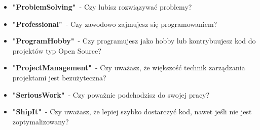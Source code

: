\begin{appendices}
\begin{itemize}
        \item \textbf{"ProblemSolving"}~- Czy lubisz rozwiązywać problemy?
        \item \textbf{"Professional"}~- Czy zawodowo zajmujesz się programowaniem?
        \item \textbf{"ProgramHobby"}~- Czy programujesz jako hobby lub kontrybuujesz kod do projektów typ Open Source?
        \item \textbf{"ProjectManagement"}~- Czy uważasz, że większość technik zarządzania projektami jest bezużyteczna?
        \item \textbf{"SeriousWork"}~- Czy poważnie podchodzisz do swojej pracy?
        \item \textbf{"ShipIt"}~- Czy uważasz, że lepiej szybko dostarczyć kod, nawet jeśli nie jest zoptymalizowany?

\end{itemize}
\end{appendices}
